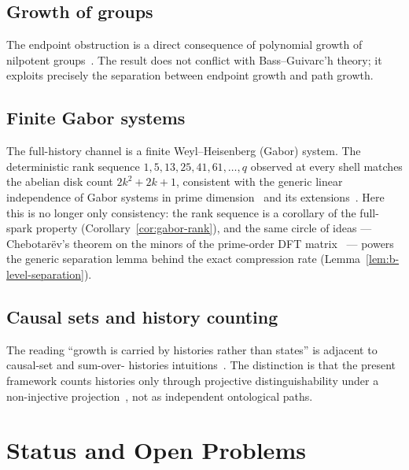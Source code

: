 \documentclass[11pt]{article}
\begin{document}
\subsection{Growth of groups}
The endpoint obstruction is a direct consequence of polynomial growth of nilpotent
groups~\cite{Bass1972,Guivarch1973}.
The result does not conflict with Bass--Guivarc'h theory; it exploits precisely the separation between
endpoint growth and path growth.

\subsection{Finite Gabor systems}
The full-history channel is a finite Weyl--Heisenberg (Gabor) system.
The deterministic rank sequence $1,5,13,25,41,61,\dots,q$ observed at every shell matches the abelian disk
count $2k^2+2k+1$, consistent with the generic linear independence of Gabor systems in prime
dimension~\cite{Lawrence2005} and its extensions~\cite{Malikiosis2015}.
Here this is no longer only consistency: the rank sequence is a corollary of the full-spark property
(Corollary~\ref{cor:gabor-rank}), and the same circle of ideas --- Chebotar\"ev's theorem on the minors of
the prime-order DFT matrix~\cite{EvansIsaacs1976} --- powers the generic separation lemma behind the exact
compression rate (Lemma~\ref{lem:b-level-separation}).

\subsection{Causal sets and history counting}
The reading ``growth is carried by histories rather than states'' is adjacent to causal-set and sum-over-
histories intuitions~\cite{Bombelli1987}.
The distinction is that the present framework counts histories only through projective distinguishability
under a non-injective projection~\cite{Cosmochrony,Beau2026b}, not as independent ontological paths.

\section{Status and Open Problems}
\label{sec:status}
\end{document}
